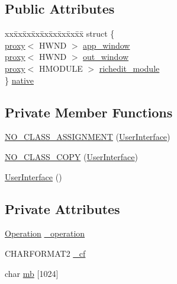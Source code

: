 \subsection*{Public Attributes}
\begin{DoxyCompactItemize}
\item 
\begin{tabbing}
xx\=xx\=xx\=xx\=xx\=xx\=xx\=xx\=xx\=\kill
struct \{\\
\>\hyperlink{class_user_interface_1_1proxy}{proxy}$<$ HWND $>$ \hyperlink{class_user_interface_aad3c98521a8dfaada49a7cdfbbffe460}{app\_window}\\
\>\hyperlink{class_user_interface_1_1proxy}{proxy}$<$ HWND $>$ \hyperlink{class_user_interface_ac0664b576cc8c7602b93ecad99bc1db2}{out\_window}\\
\>\hyperlink{class_user_interface_1_1proxy}{proxy}$<$ HMODULE $>$ \hyperlink{class_user_interface_aa90dd9e865c9f60e9c1e2b912f8accc2}{richedit\_module}\\
\} \hyperlink{class_user_interface_a595a7fa3433e823c9f4c739a4e79fbd2}{native}\\

\end{tabbing}\end{DoxyCompactItemize}
\subsection*{Private Member Functions}
\begin{DoxyCompactItemize}
\item 
\hyperlink{class_user_interface_a415123317fc599a5daf0c232989556c1}{N\-O\-\_\-\-C\-L\-A\-S\-S\-\_\-\-A\-S\-S\-I\-G\-N\-M\-E\-N\-T} (\hyperlink{class_user_interface}{User\-Interface})
\item 
\hyperlink{class_user_interface_ae7376a30d1dc87ac1f4cd89d9a7161c4}{N\-O\-\_\-\-C\-L\-A\-S\-S\-\_\-\-C\-O\-P\-Y} (\hyperlink{class_user_interface}{User\-Interface})
\item 
\hyperlink{class_user_interface_ae6fb70370701b3bd6120e923df9705b0}{User\-Interface} ()
\end{DoxyCompactItemize}
\subsection*{Private Attributes}
\begin{DoxyCompactItemize}
\item 
\hyperlink{class_operation}{Operation} \hyperlink{class_user_interface_a3b2271f8ea1c216fa72b0be285b4d496}{\-\_\-operation}
\item 
C\-H\-A\-R\-F\-O\-R\-M\-A\-T2 \hyperlink{class_user_interface_a3ccd60a6a765b9935cb9e357dae0e601}{\-\_\-cf}
\item 
char \hyperlink{class_user_interface_a5faafd7fea747b9dd3ab8674082a4a45}{mb} \mbox{[}1024\mbox{]}
\end{DoxyCompactItemize}
